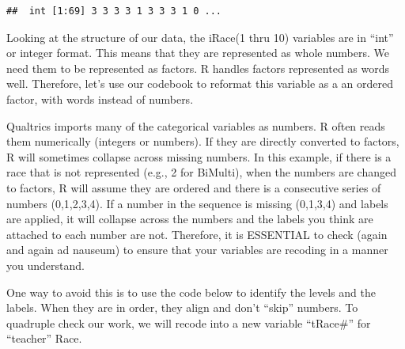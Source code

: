 \documentclass[
  11pt,
]{book}
\newenvironment{Shaded}{\begin{snugshade}}{\end{snugshade}}
\newcommand{\FunctionTok}[1]{\textcolor[rgb]{0.27,0.27,0.27}{\textbf{#1}}}
\newcommand{\NormalTok}[1]{#1}
\newcommand{\SpecialCharTok}[1]{\textcolor[rgb]{0.43,0.43,0.43}{\textbf{#1}}}
\begin{document}
\begin{Shaded}
\end{Shaded}

\begin{verbatim}
##  int [1:69] 3 3 3 3 1 3 3 3 1 0 ...
\end{verbatim}

Looking at the structure of our data, the iRace(1 thru 10) variables are in ``int'' or integer format. This means that they are represented as whole numbers. We need them to be represented as factors. R handles factors represented as words well. Therefore, let's use our codebook to reformat this variable as a an ordered factor, with words instead of numbers.

Qualtrics imports many of the categorical variables as numbers. R often reads them numerically (integers or numbers). If they are directly converted to factors, R will sometimes collapse across missing numbers. In this example, if there is a race that is not represented (e.g., 2 for BiMulti), when the numbers are changed to factors, R will assume they are ordered and there is a consecutive series of numbers (0,1,2,3,4). If a number in the sequence is missing (0,1,3,4) and labels are applied, it will collapse across the numbers and the labels you think are attached to each number are not. Therefore, it is ESSENTIAL to check (again and again ad nauseum) to ensure that your variables are recoding in a manner you understand.

One way to avoid this is to use the code below to identify the levels and the labels. When they are in order, they align and don't ``skip'' numbers. To quadruple check our work, we will recode into a new variable ``tRace\#'' for ``teacher'' Race.
\end{document}
